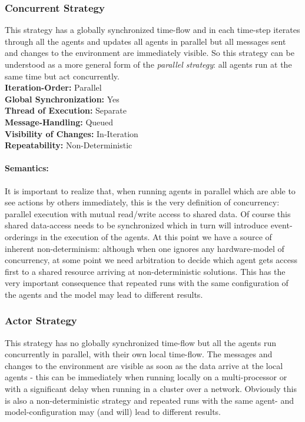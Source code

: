 \subsubsection{Concurrent Strategy}
This strategy has a globally synchronized time-flow and in each time-step iterates through all the agents and updates all agents in parallel but all messages sent and changes to the environment are immediately visible. So this strategy can be understood as a more general form of the \textit{parallel strategy}: all agents run at the same time but act concurrently. \\

\textbf{Iteration-Order:} Parallel \\
\textbf{Global Synchronization:} Yes \\
\textbf{Thread of Execution:} Separate \\
\textbf{Message-Handling:} Queued \\
\textbf{Visibility of Changes:}	In-Iteration \\
\textbf{Repeatability:}	Non-Deterministic

\paragraph{Semantics:} It is important to realize that, when running agents in parallel which are able to see actions by others immediately, this is the very definition of concurrency: parallel execution with mutual read/write access to shared data. Of course this shared data-access needs to be synchronized which in turn will introduce event-orderings in the execution of the agents. At this point we have a source of inherent non-determinism: although when one ignores any hardware-model of concurrency, at some point we need arbitration to decide which agent gets access first to a shared resource arriving at non-deterministic solutions. This has the very important consequence that repeated runs with the same configuration of the agents and the model may lead to different results.


\subsubsection{Actor Strategy}
This strategy has no globally synchronized time-flow but all the agents run concurrently in parallel, with their own local time-flow. The messages and changes to the environment are visible as soon as the data arrive at the local agents - this can be immediately when running locally on a multi-processor or with a significant delay when running in a cluster over a network. Obviously this is also a non-deterministic strategy and repeated runs with the same agent- and model-configuration may (and will) lead to different results. \\

